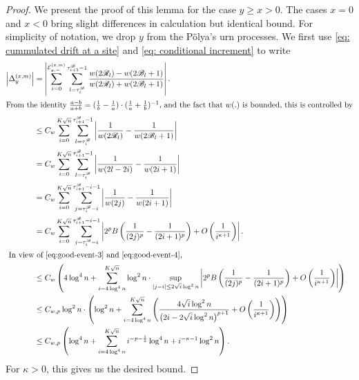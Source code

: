 \documentclass[EJP]{ejpecp} %
\begin{document}
\begin{proof}%
	We present the proof of this lemma for the case $y \ge  x > 0$. The cases $x = 0$ and $x<0$ bring slight differences in calculation but identical bound. For simplicity of notation, we drop $y$ from the P\"olya's urn processes. We first use \eqref{eq: cummulated drift at a site} and \eqref{eq: conditional increment} to write 
	\begin{align*}
		\left| \Delta_y^{(x,m)} \right| 
		&= 
		\left| 	\sum_{i = 0}^{\mathcal{E}_{y,-}^{(x,m)}} 
		\sum_{l = \tau_i^{\mathscr{B}}} ^{\tau_{i+1}^{\mathscr{B}}  -1}
		\frac{w(2 \mathscr{R}_l)- w(2 \mathscr{B}_l + 1)}{w(2 \mathscr{R}_l)+ w(2 \mathscr{B}_l + 1)}
		\right| .\\
		\intertext{From the identity $\frac{a - b}{a + b} = (\frac{1}{b} - \frac{1}{a})\cdot(\frac{1}{a} + \frac{1}{b})^{-1}$, and the fact that $w(.)$ is bounded, this is controlled by}
		&\le C_w \sum_{i = 0}^{K \sqrt{n} } \sum_{l = \tau_i^{\mathscr{B}}} ^{\tau_{i+1}^{\mathscr{B}}  -1}
		\left| \frac{1}{w(2 \mathscr{R}_l)} - \frac{1}{w(2 \mathscr{B}_l + 1)} \right|  \\
		&= C_w \sum_{i = 0}^{K \sqrt{n} } \sum_{l = \tau_i^{\mathscr{B}}} ^{\tau_{i+1}^{\mathscr{B}}  -1}
		\left| \frac{1}{w(2 l - 2 i)} - \frac{1}{w(2i + 1)} \right|  \\
		&= C_w \sum_{i = 0}^{K \sqrt{n} }
		\sum_{j = \tau_i^{\mathscr{B}} - i}^{\tau_{i+1}^{\mathscr{B}} - i - 1} \left| \frac{1}{w(2j)} - \frac{1}{w(2i + 1)} \right|  \\
		&= C_w \sum_{i = 0}^{K \sqrt{n} }
		\sum_{j = \tau_i^{\mathscr{B}} - i}^{\tau_{i+1}^{\mathscr{B}} - i - 1} \left|  2^p B\left( \frac{1}{(2j)^p} - \frac{1}{(2i + 1)^p} \right)  + O\left( \frac{1}{i^{\kappa + 1}} \right) \right|  .\\
		\intertext{
			In view of \eqref{eq:good-event-3} and \eqref{eq:good-event-4},
		}
		&\le C_w \left(4 \log^4 n + \sum_{i = 4 \log^4 n}^{K \sqrt{n} } \log^2 n \cdot \sup_{|j - i| \le 2 \sqrt{i}  \log^2 n} \left|  2^p B\left( \frac{1}{(2j)^p} - \frac{1}{(2i + 1)^p} \right)  + O\left( \frac{1}{i^{\kappa + 1}} \right) \right|\right)\\
		&\le C_{w, p} \log^2 n \cdot \left( \log^2 n + \sum_{i = 4 \log^4 n}^{K \sqrt{n} } \left( 
		\frac{4 \sqrt{ i } \log^2 n }{\left(2 i - 2 \sqrt{ i } \log^2 n\right)^{p + 1}} 
		+ O\left( \frac{1}{i^{\kappa + 1}} \right)
		\right) \right)  \\
		&\le C_{w, p} \left(\log^4 n + \sum_{i = 4 \log^4 n}^{K \sqrt{n} } i^{- p - \frac{1}{2}} \log^4 n + i^{- \kappa - 1 } \log^2 n \right)
		.\end{align*} 
	For $\kappa>0$, this gives us the desired bound.
\end{proof}
\end{document}
